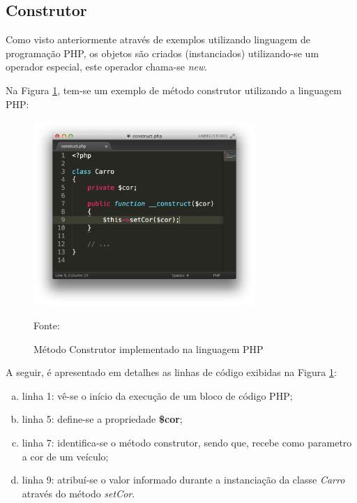\subsection{Construtor}

Como visto anteriormente através de exemplos utilizando linguagem de
programação \acs{PHP}, os objetos são criados (instanciados) utilizando-se um
operador especial, este operador chama-se \textit{new}.


Na Figura \ref{fig:metodoConstrutor}, tem-se um exemplo de método construtor
utilizando a linguagem \acs{PHP}:

\begin{figure}[h!tb]
	\caption{Método Construtor implementado na linguagem PHP}
	\label{fig:metodoConstrutor}

	\centering
	\includegraphics[width=0.75\textwidth]{images/construct.png}

	\centering
	\footnotesize Fonte: \fonteOAutor
\end{figure}

\FloatBarrier 	%

A seguir, é apresentado em detalhes as linhas de código exibidas na Figura 
\ref{fig:metodoConstrutor}:

\begin{enumerate}[a)]
    \item linha 1: vê-se o início da execução de um bloco de código PHP;
    \item linha 5: define-se a propriedade \textbf{\$cor};
    \item linha 7: identifica-se o método construtor, sendo que, recebe como
    parametro a cor de um veículo;
    \item linha 9: atribuí-se o valor informado durante a instanciação da classe
    \textit{Carro} através do método \textit{setCor}.
\end{enumerate}

